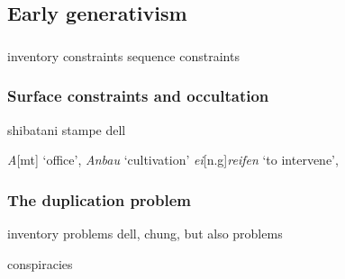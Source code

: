 \subsection{Early generativism}


\subsubsection{\citealt{Stanley1967}}

inventory constraints
sequence constraints

\subsubsection{Surface constraints and occultation}

shibatani
stampe
dell

\emph{A}[mt] `office', \emph{Anbau} `cultivation'
\emph{ei}[n.g]\emph{reifen} `to intervene',

\subsubsection{The duplication problem}

inventory problems 
dell, chung, but also problems

conspiracies
